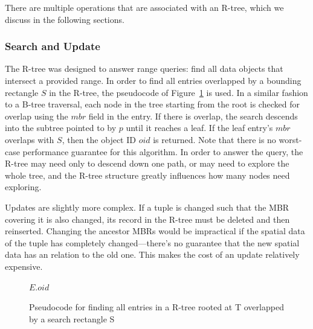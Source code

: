 There are multiple operations that are associated with an R-tree, which we 
discuss in the following sections.

\subsubsection{Search and Update}
The R-tree was designed to answer range queries: find all data objects that intersect a provided range.
In order to find all entries overlapped by a bounding rectangle $S$ in the 
R-tree, the pseudocode of Figure~\ref{fig:R_Tree_Search} is used. In a similar 
fashion to a B-tree traversal, each node in the tree starting from the root is 
checked for overlap using the $mbr$ field in the entry. If there is overlap, 
the search descends into the subtree pointed to by $p$ until it reaches a leaf. 
If the leaf entry's $mbr$ overlaps with $S$, then the object ID $oid$ is 
returned. Note that there is no worst-case performance guarantee for this
algorithm.
In order to answer the query, the R-tree may need only to descend down one path,
or may need to explore the whole tree, and the R-tree structure greatly influences
how many nodes need exploring.

Updates are slightly more complex. If a tuple is changed such that the MBR
covering it is also changed, its record in the R-tree must be deleted and then
reinserted. 
Changing the ancestor MBRs would be impractical if the spatial data of the tuple
has completely changed---there's no guarantee that the new spatial data has an relation
to the old one.
This makes the cost of an update relatively expensive.

\begin{figure}[t]
\begin{algorithmic}
					\State {}
				\EndIf
			\EndFor
		\Else
					\Return $E.oid$
				\EndIf
			\EndFor
		\EndIf
	\EndFunction
\end{algorithmic}
\caption{Pseudocode for finding all entries in a R-tree rooted at T overlapped 
	by a search rectangle S}
\label{fig:R_Tree_Search}
\end{figure}


